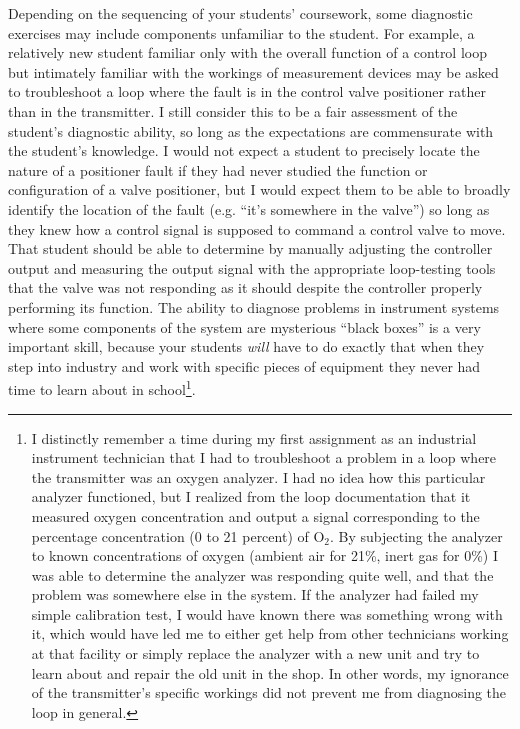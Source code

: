 Depending on the sequencing of your students' coursework, some diagnostic exercises may include components unfamiliar to the student.  For example, a relatively new student familiar only with the overall function of a control loop but intimately familiar with the workings of measurement devices may be asked to troubleshoot a loop where the fault is in the control valve positioner rather than in the transmitter.  I still consider this to be a fair assessment of the student's diagnostic ability, so long as the expectations are commensurate with the student's knowledge.  I would not expect a student to precisely locate the nature of a positioner fault if they had never studied the function or configuration of a valve positioner, but I would expect them to be able to broadly identify the location of the fault (e.g. ``it's somewhere in the valve'') so long as they knew how a control signal is supposed to command a control valve to move.  That student should be able to determine by manually adjusting the controller output and measuring the output signal with the appropriate loop-testing tools that the valve was not responding as it should despite the controller properly performing its function.  The ability to diagnose problems in instrument systems where some components of the system are mysterious ``black boxes'' is a very important skill, because your students \textit{will} have to do exactly that when they step into industry and work with specific pieces of equipment they never had time to learn about in school\footnote{I distinctly remember a time during my first assignment as an industrial instrument technician that I had to troubleshoot a problem in a loop where the transmitter was an oxygen analyzer.  I had no idea how this particular analyzer functioned, but I realized from the loop documentation that it measured oxygen concentration and output a signal corresponding to the percentage concentration (0 to 21 percent) of O$_{2}$.  By subjecting the analyzer to known concentrations of oxygen (ambient air for 21\%, inert gas for 0\%) I was able to determine the analyzer was responding quite well, and that the problem was somewhere else in the system.  If the analyzer had failed my simple calibration test, I would have known there was something wrong with it, which would have led me to either get help from other technicians working at that facility or simply replace the analyzer with a new unit and try to learn about and repair the old unit in the shop.  In other words, my ignorance of the transmitter's specific workings did not prevent me from diagnosing the loop in general.}.

